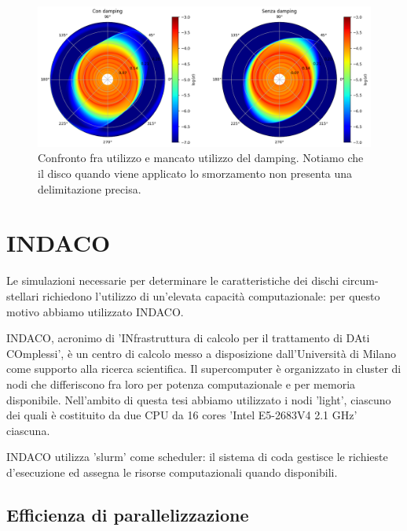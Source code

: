 \begin{figure}[h]
    \centering
    \includegraphics[width=\textwidth]{Immagini/Simulazioni/ConSenzaDamping.png}
    \caption{Confronto fra utilizzo e mancato utilizzo del damping. Notiamo che il disco quando viene applicato lo smorzamento non presenta una delimitazione precisa.}
    \label{fig:si_no_dump}
\end{figure}

\section{INDACO}

Le simulazioni necessarie per determinare le caratteristiche dei dischi circum-stellari richiedono l'utilizzo di un'elevata capacità computazionale: per questo motivo abbiamo utilizzato INDACO.

INDACO, acronimo di 'INfrastruttura di calcolo per il trattamento di DAti COmplessi', è un centro di calcolo messo a disposizione dall'Università di Milano come supporto alla ricerca scientifica.
Il supercomputer è organizzato in cluster di nodi che differiscono fra loro per potenza computazionale e per memoria disponibile. Nell'ambito di questa tesi abbiamo utilizzato i nodi 'light', ciascuno dei quali è costituito da due CPU da 16 cores 'Intel E5-2683V4   2.1 GHz' ciascuna.

INDACO utilizza 'slurm' come scheduler: il sistema di coda gestisce le richieste d'esecuzione ed assegna le risorse computazionali quando disponibili.

\subsection{Efficienza di parallelizzazione}

